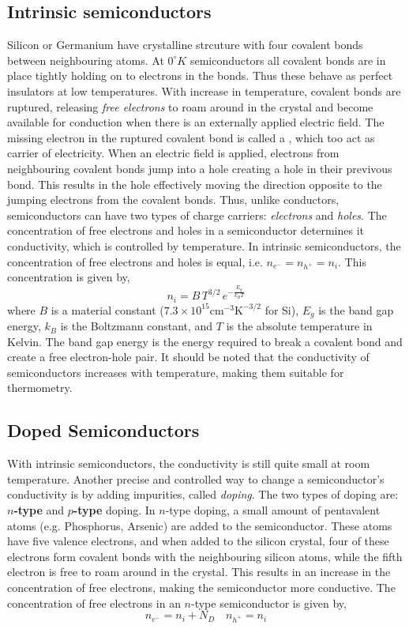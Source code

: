 \subsection{Intrinsic semiconductors}
Silicon or Germanium have crystalline strcuture with four covalent bonds between neighbouring atoms. At $0^\circ K$ semiconductors all covalent bonds are in place tightly holding on to electrons in the bonds. Thus these behave as perfect insulators at low temperatures. With increase in temperature, covalent bonds are ruptured, releasing \textit{free electrons} to roam around in the crystal and become available for conduction when there is an externally applied electric field. The missing electron in the ruptured covalent bond is called a , which too act as carrier of electricity. When an electric field is applied, electrons from neighbouring covalent bonds jump into a hole creating a hole in their previvous bond. This results in the hole effectively moving the direction opposite to the jumping electrons from the covalent bonds. Thus, unlike conductors, semiconductors can have two types of charge carriers: \textit{electrons} and \textit{holes}. The concentration of free electrons and holes in a semiconductor determines it conductivity, which is controlled by temperature. In intrinsic semiconductors, the concentration of free electrons and holes is equal, i.e. $n_{e^-} = n_{h^+} = n_i$. This concentration is given by,
\begin{equation}
    n_i = B \, T^{3/2} \, e^{-\frac{E_g}{k_B T}}
    \label{eq:ch03-intrinsic-elec-conc}
\end{equation}
where $B$ is a material constant ($7.3 \times 10^15 \text{cm}^{-3}\text{K}^{-3/2}$ for Si), $E_g$ is the band gap energy, $k_B$ is the Boltzmann constant, and $T$ is the absolute temperature in Kelvin. The band gap energy is the energy required to break a covalent bond and create a free electron-hole pair. It should be noted that the conductivity of semiconductors increases with temperature, making them suitable for thermometry.

\subsection{Doped Semiconductors}
With intrinsic semiconductors, the conductivity is still quite small at room temperature. Another precise and controlled way to change a semiconductor's conductivity is by adding impurities, called \textit{doping}. The two types of doping are: \textbf{$n$-type} and \textbf{$p$-type} doping. In $n$-type doping, a small amount of pentavalent atoms (e.g. Phosphorus, Arsenic) are added to the semiconductor. These atoms have five valence electrons, and when added to the silicon crystal, four of these electrons form covalent bonds with the neighbouring silicon atoms, while the fifth electron is free to roam around in the crystal. This results in an increase in the concentration of free electrons, making the semiconductor more conductive. The concentration of free electrons in an $n$-type semiconductor is given by,
\begin{equation}
    n_{e^-} = n_i + N_D \quad n_{h^+} = n_i
    \label{eq:ch03-n-type-elec-conc}
\end{equation}


